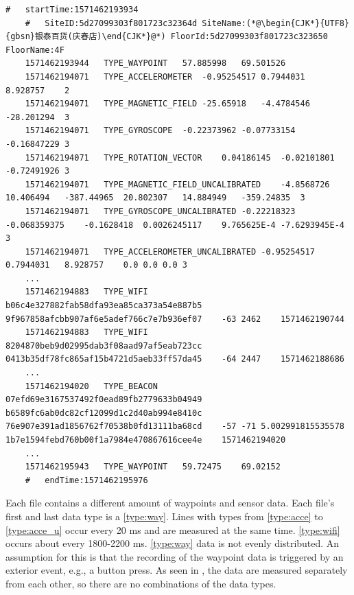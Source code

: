 
\begin{lstlisting}[caption={A snippet from the dataset of the file 5daa9e38df065a00069beb79.txt of the floor F4},label={lst:dataset}]
    #   startTime:1571462193934
    #   SiteID:5d27099303f801723c32364d SiteName:(*@\begin{CJK*}{UTF8}{gbsn}银泰百货(庆春店)\end{CJK*}@*) FloorId:5d27099303f801723c323650 FloorName:4F
    1571462193944   TYPE_WAYPOINT   57.885998   69.501526
    1571462194071   TYPE_ACCELEROMETER  -0.95254517 0.7944031   8.928757    2
    1571462194071   TYPE_MAGNETIC_FIELD -25.65918   -4.4784546  -28.201294  3
    1571462194071   TYPE_GYROSCOPE  -0.22373962 -0.07733154 -0.16847229 3
    1571462194071   TYPE_ROTATION_VECTOR    0.04186145  -0.02101801 -0.72491926 3
    1571462194071   TYPE_MAGNETIC_FIELD_UNCALIBRATED    -4.8568726  10.406494   -387.44965  20.802307   14.884949   -359.24835  3
    1571462194071   TYPE_GYROSCOPE_UNCALIBRATED -0.22218323 -0.068359375    -0.1628418  0.0026245117    9.765625E-4 -7.6293945E-4   3
    1571462194071   TYPE_ACCELEROMETER_UNCALIBRATED -0.95254517 0.7944031   8.928757    0.0 0.0 0.0 3
    ...
    1571462194883   TYPE_WIFI   b06c4e327882fab58dfa93ea85ca373a54e887b5    9f967858afcbb907af6e5adef766c7e7b936ef07    -63 2462    1571462190744
    1571462194883   TYPE_WIFI   8204870beb9d02995dab3f08aad97af5eab723cc    0413b35df78fc865af15b4721d5aeb33ff57da45    -64 2447    1571462188686
    ...
    1571462194020   TYPE_BEACON 07efd69e3167537492f0ead89fb2779633b04949    b6589fc6ab0dc82cf12099d1c2d40ab994e8410c    76e907e391ad1856762f70538b0fd13111ba68cd    -57 -71 5.002991815535578   1b7e1594febd760b00f1a7984e470867616cee4e    1571462194020
    ...
    1571462195943   TYPE_WAYPOINT   59.72475    69.02152
    #   endTime:1571462195976
\end{lstlisting}

Each file contains a different amount of waypoints and sensor data.
Each file's first and last data type is a \ref{type:way}.
Lines with types from \ref{type:acce} to \ref{type:acce_u} occur every 20 ms and are measured at the same time.
\ref{type:wifi} occurs about every 1800-2200 ms.
\ref{type:way} data is not evenly distributed.
An assumption for this is that the recording of the waypoint data is triggered by an exterior event, e.g., a button press.
As seen in , the data are measured separately from each other, so there are no combinations of the data types.

